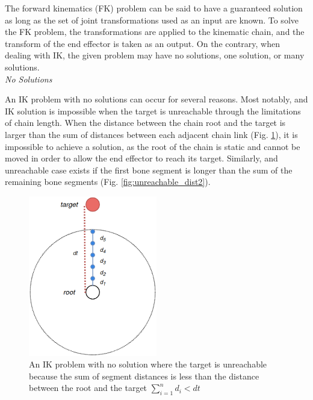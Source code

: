 The forward kinematics (FK) problem can be said to have a guaranteed solution as
long as the set of joint transformations used as an input are known. To solve
the FK problem, the transformations are applied to the kinematic chain, and the
transform of the end effector is taken as an output. On the contrary, when
dealing with IK, the given problem may have no solutions, one solution, or many
solutions. \\

\noindent\textit{No Solutions}

An IK problem with no solutions can occur for several reasons. Most notably, and
IK solution is impossible when the target is unreachable through the limitations
of chain length. When the distance between the chain root and the target is
larger than the sum of distances between each adjacent chain link (Fig.
\ref{fig:unreachable_dist1}), it is impossible to achieve a solution, as the
root of the chain is static and cannot be moved in order to allow the end
effector to reach its target. Similarly, and unreachable case exists if the
first bone segment is longer than the sum of the remaining bone segments (Fig.
\ref{fig:unreachable_dist2}).

\begin{figure}[!h]
    \centering
    \captionsetup{justification=centering}
    \includegraphics[width=0.5\textwidth]{grafika/unreachable_dist_1.eps}
    \caption{An IK problem with no solution where the target is unreachable
    because the sum of segment distances is less than the distance between the
    root and the target \(\sum_{i=1}^{n}d_i < dt\) }
    \label{fig:unreachable_dist1}
\end{figure}

